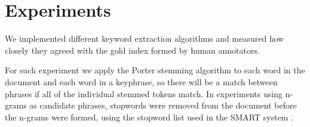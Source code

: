 \section{Experiments}
\label{sec:exp}



We implemented different keyword extraction algorithms and measured how closely they agreed with the gold index formed by human annotators.


For each experiment we apply the Porter stemming algorithm to each word in the document and each word in a keyphrase, so there will be a match between phrases if all of the individual stemmed tokens match. In experiments using n-grams as candidate phrases, stopwords were removed from the document before the n-grams were formed, using the stopword list used in the SMART system \cite{salton1971smart}. 
